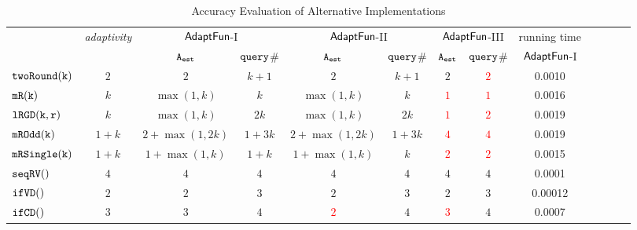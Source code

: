 {\scriptsize
\begin {table}[t]
\vspace{-0.5cm}
    \caption{Accuracy Evaluation of {\THESYSTEM}  Alternative Implementations}
    \vspace{-0.3cm}
        \label{tb:adapt-imp-alternatives}
        \begin{center}
        \centering
{\scriptsize
        \begin{tabular}{ | >{\tiny}l | c | c | c | c | c | c | c | c | c | c | c |c}
        \hline \hline
        \multirow{2}{*}{Program $c$}
        &\multirow{2}{*}{\emph{adaptivity}}
         & \multicolumn{2}{c|}{$\textsf{AdaptFun}$-I}
         & \multicolumn{2}{c|}{$\textsf{AdaptFun}$-II}
         & \multicolumn{2}{c|}{$\textsf{AdaptFun}$-III}
         & {running time} \\ 
         \cline{3-9}
        & & {${\mathtt{A_{est}}}$ } & {${\tt query}$\# } & {${\mathtt{A_{est}}}$ } & {${\tt query}$\# } & {${\mathtt{A_{est}}}$ } & {${\tt query}$\# } & $\textsf{AdaptFun}$-I \\
         \cline{6-9}
         \hline \hline
         $  \mathtt{twoRound(k)}$ &  $2$  &  $2$    & $k+1 $  & $2$ & $k + 1$ & $2$ & \textcolor{red}{$2$} & 0.0010   \\
         $  \mathtt{mR(k)}$ &  $k$ &   $\max(1,k)$ & $k$  &  $\max(1,k)$ & $k$ & \textcolor{red}{$1$} & \textcolor{red}{$1$} & 0.0016 \\
         $  \mathtt{lRGD(k, r)}$ &  $k$ & $\max(1,k) $ & $ 2k $  &  $\max(1,k) $ & $ 2k $ & \textcolor{red}{$1$} & \textcolor{red}{$2$} & 0.0019   \\
         $  \mathtt{mROdd(k)}$  &  $1+k$ &  $2+\max(1,2k)  $ & $1 + 3 k $  &  $2+\max(1,2k)  $ & $1 + 3 k $  & \textcolor{red}{$4$} & \textcolor{red}{$4$} & 0.0019 \\
         $  \mathtt{mRSingle(k)}$  &  $1+k$   & $1+ \max(1, k) $ & $1 + k$  &  $1+ \max(1, k) $ & $k$ & \textcolor{red}{$2$} & \textcolor{red}{$2$} & 0.0015  \\
         $  \mathtt{seqRV()}$  &  $4$  & $4$ &   $4$  & $4$ & $4$ & $4$ & $4$ & 0.0001 \\
         $  \mathtt{ifVD()}$  &  $2$  & $2$ &   $3$  & $2$ & $3$ & $2$ & $3$ & 0.00012 \\
         $  \mathtt{ifCD()}$  &  $3$  & $3$ &   $4$  & \textcolor{red}{$2$} & $4$ & \textcolor{red}{$3$} & $4$ & 0.0007 \\

\end{tabular}}
\end{center}
\end{table}}
